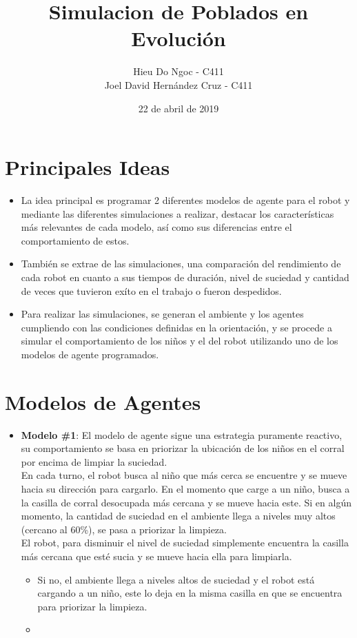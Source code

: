 \documentclass[12pt]{article}
\title{Simulacion de Poblados en Evoluci\'on}
\author{Hieu Do Ngoc - C411 \\ Joel David Hern\'andez Cruz - C411}
\date{22 de abril de 2019}
\begin{document}
\maketitle
\newpage

\section{Principales Ideas} 
\begin{itemize}
	\item La idea principal es programar 2 diferentes modelos de agente 
	para el robot y mediante las diferentes simulaciones a realizar, destacar
	los caracter\'isticas m\'as relevantes de cada modelo, as\'i como 
	sus diferencias entre el comportamiento de estos.
	\item Tambi\'en se extrae de las simulaciones, una comparaci\'on del 
	rendimiento de	cada robot en cuanto a sus tiempos de duraci\'on, nivel 
	de	suciedad y cantidad de veces que tuvieron ex\'ito en el trabajo o fueron
	despedidos.
	\item Para realizar las simulaciones, se generan el ambiente y los agentes
	cumpliendo con las condiciones definidas en la orientaci\'on, y se procede 
	a simular el comportamiento de los ni\~nos y el del robot utilizando uno de 
	los modelos de agente programados.	
\end{itemize}

\section{Modelos de Agentes}
\begin{itemize}
	\item \textbf{Modelo \#1}:
	El modelo de agente sigue una estrategia puramente reactivo, 
	su comportamiento se basa en priorizar la ubicaci\'on de los ni\~nos en el 
	corral por encima de limpiar la suciedad.\\
	En cada turno, el robot busca al ni\~no que m\'as cerca se encuentre 
	y se mueve hacia su direcci\'on para cargarlo. En el momento que carge
	a un ni\~no, busca a la casilla de corral desocupada m\'as cercana y 
	se mueve hacia este. Si en alg\'un momento, la cantidad de suciedad en el
	ambiente llega a 	niveles muy altos (cercano al 60\%), se pasa a priorizar
	la limpieza.\\
	El robot, para disminuir el nivel de suciedad simplemente encuentra la 
	casilla m\'as cercana que est\'e sucia y se mueve hacia ella para limpiarla.
	\begin{itemize} \textit{Algunos detalles sobre este modelo:}
		\item Si no, el ambiente llega a niveles altos de suciedad y el robot 
		est\'a cargando a un ni\~no, este lo deja en la misma casilla en que se
		encuentra para priorizar la limpieza.
		\item 
	\end{itemize}
\end{itemize}
\end{document}
